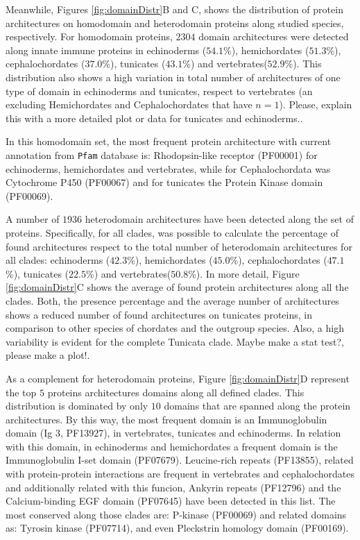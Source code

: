 \documentclass[11pt]{article}
\newcommand{\TODO}[1]{\begingroup\color{red}#1\endgroup}
\begin{document}
Meanwhile, Figures \ref{fig:domainDistr}B and C, shows the distribution of 
protein architectures on homodomain and heterodomain proteins along studied 
species, respectively. For homodomain proteins, $2304$ domain architectures 
were detected along innate immune proteins in echinoderms ($54.1$\%), 
hemichordates ($51.3$\%), cephalochordates ($37.0$\%), tunicates ($43.1$\%) and 
vertebrates($52.9$\%). This distribution also shows a high variation in 
total number of architectures of one type of domain in echinoderms and 
tunicates, respect to vertebrates (an excluding Hemichordates and 
Cephalochordates that have $n=1$). \TODO{Please, explain this with a more 
detailed plot or data for tunicates and echinoderms.}.

In this homodomain set, the most frequent protein architecture with 
current annotation from \texttt{Pfam} database is: Rhodopsin-like receptor 
(PF00001) for echinoderms, hemichordates and vertebrates, while for 
Cephalochordata was Cytochrome P450 (PF00067) and for tunicates the Protein 
Kinase domain (PF00069). 

A number of $1936$ heterodomain architectures have been detected along the set 
of proteins. Specifically, for all clades, was possible to calculate 
the percentage of found architectures respect to the total number of 
heterodomain architectures for all clades: echinoderms ($42.3$\%), 
hemichordates ($45.0$\%), cephalochordates ($47.1$\%), tunicates 
($22.5$\%) and vertebrates($50.8$\%). In more detail, 
Figure \ref{fig:domainDistr}C shows the average of found protein architectures 
along all the clades. Both, the presence percentage and the average number of 
architectures shows a reduced number of found architectures on tunicates 
proteins, in comparison to other species of chordates and the outgroup species. 
Also, a high variability is evident for the complete Tunicata clade. \TODO{Maybe 
make a stat test?, please make a plot!}.  

As a complement for heterodomain proteins, Figure \ref{fig:domainDistr}D 
represent the top $5$ proteins architectures domains along all defined clades. 
This distribution is dominated by only $10$ domains that are spanned along 
the protein architectures. By this way, the most frequent domain is an 
Immunoglobulin domain (Ig 3, PF13927), in vertebrates, tunicates and 
echinoderms. In relation with this domain, in echinoderms and hemichordates a 
frequent domain is the Immunoglobulin I-set domain (PF07679). Leucine-rich 
repeats (PF13855), related with protein-protein interactions are frequent in 
vertebrates and cephalochordates and additionally related with this funcion, 
Ankyrin repeats (PF12796) and the Calcium-binding EGF domain (PF07645) have 
been detected in this list. The most conserved along those clades are: P-kinase 
(PF00069) and related domains as: Tyrosin kinase (PF07714), and even Pleckstrin 
homology domain (PF00169). 
\end{document}
